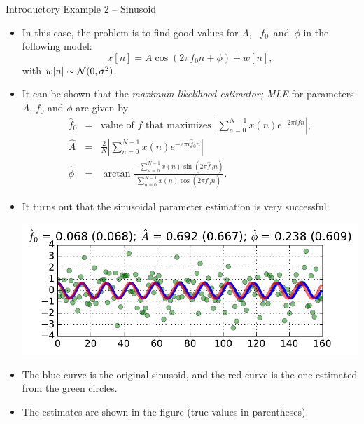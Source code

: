 \documentclass[10pt, aspectratio=169]{beamer} %
\begin{document}
\begin{frame}[allowframebreaks=0.8]{Introductory Example 2 -- Sinusoid}
 \begin{itemize}
\item In this case, the problem is to find good values for $A$,~%
$f_0$~and~$\phi$ in the following model:
\[
x[n] = A\cos(2\pi f_0 n + \phi) + w[n],
\]
with $w[n]\sim {\cal N}(0,\sigma^2)$.

\item It can be shown that the \emph{maximum likelihood estimator; MLE}
for parameters $A$, $f_0$ and $\phi$ are given by
\begin{eqnarray*}
\hat{f}_0 &=& \text{value of } f \text{ that maximizes } \left|\sum_{n=0}^{N-1} x(n)e^{-2\pi i f n}\right|,\\
\hat{A} &=& \frac2N \left|\sum_{n=0}^{N-1} x(n)e^{-2\pi i \hat{f}_0 n}\right| \\
\hat{\phi} &=& \arctan \frac{-\sum_{n=0}^{N-1} x(n)\sin(2\pi \hat{f}_0 n)}{\sum_{n=0}^{N-1} x(n)\cos(2\pi \hat{f}_0 n)}.
\end{eqnarray*}

\item It turns out that the sinusoidal parameter estimation is very
successful:
\centerline{\includegraphics[width=\imagewidth]{MLSinusoid.pdf}}
\item The blue curve is the original sinusoid, and the red curve is the one estimated
from the green circles.
\item The estimates are shown in the figure (true values in parentheses).
\end{itemize}
\end{frame}
\end{document}
